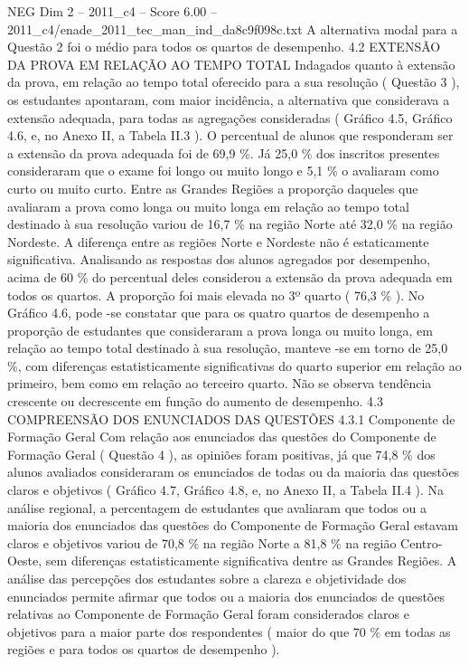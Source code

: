 \begin{textsample}{NEG Dim 2 – 2011\_c4 – Score 6.00 – 2011\_c4/enade\_2011\_tec\_man\_ind\_da8c9f098c.txt}
A alternativa modal para a Questão 2 foi o médio para todos os quartos de desempenho. 4.2 EXTENSÃO DA PROVA EM RELAÇÃO AO TEMPO TOTAL Indagados quanto à extensão da prova, em relação ao tempo total oferecido para a sua resolução ( Questão 3 ), os estudantes apontaram, com maior incidência, a alternativa que considerava a extensão adequada, para todas as agregações consideradas ( Gráfico 4.5, Gráfico 4.6, e, no Anexo II, a Tabela II.3 ).
O percentual de alunos que responderam ser a extensão da prova adequada foi de 69,9 \%.
Já 25,0 \% dos inscritos presentes consideraram que o exame foi longo ou muito longo e 5,1 \% o avaliaram como curto ou muito curto.
Entre as Grandes Regiões a proporção daqueles que avaliaram a prova como longa ou muito longa em relação ao tempo total destinado à sua resolução variou de 16,7 \% na região Norte até 32,0 \% na região Nordeste.
A diferença entre as regiões Norte e Nordeste não é estaticamente significativa.
Analisando as respostas dos alunos agregados por desempenho, acima de 60 \% do percentual deles considerou a extensão da prova adequada em todos os quartos.
A proporção foi mais elevada no 3º quarto ( 76,3 \% ).
No Gráfico 4.6, pode -se constatar que para os quatro quartos de desempenho a proporção de estudantes que consideraram a prova longa ou muito longa, em relação ao tempo total destinado à sua resolução, manteve -se em torno de 25,0 \%, com diferenças estatisticamente significativas do quarto superior em relação ao primeiro, bem como em relação ao terceiro quarto.
Não se observa tendência crescente ou decrescente em função do aumento de desempenho. 4.3 COMPREENSÃO DOS ENUNCIADOS DAS QUESTÕES 4.3.1 Componente de Formação Geral Com relação aos enunciados das questões do Componente de Formação Geral ( Questão 4 ), as opiniões foram positivas, já que 74,8 \% dos alunos avaliados consideraram os enunciados de todas ou da maioria das questões claros e objetivos ( Gráfico 4.7, Gráfico 4.8, e, no Anexo II, a Tabela II.4 ).
Na análise regional, a percentagem de estudantes que avaliaram que todos ou a maioria dos enunciados das questões do Componente de Formação Geral estavam claros e objetivos variou de 70,8 \% na região Norte a 81,8 \% na região Centro-Oeste, sem diferenças estatisticamente significativa dentre as Grandes Regiões.
A análise das percepções dos estudantes sobre a clareza e objetividade dos enunciados permite afirmar que todos ou a maioria dos enunciados de questões relativas ao Componente de Formação Geral foram considerados claros e objetivos para a maior parte dos respondentes ( maior do que 70 \% em todas as regiões e para todos os quartos de desempenho ).

\end{textsample}
